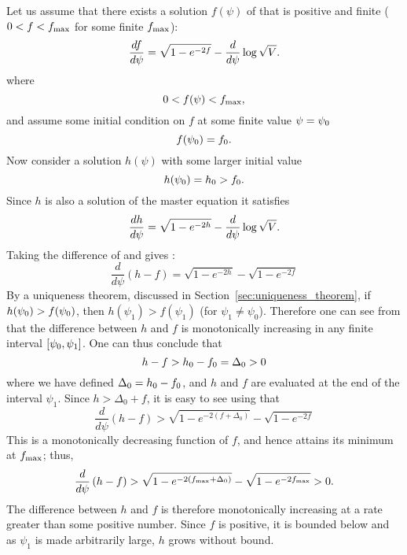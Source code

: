 Let us assume that there exists a solution $f(\psi)$ of
 that is positive and finite ($0<f<f_\mathrm{max}$ for some
finite $f_\mathrm{max}$):
%
\begin{equation}
  \frac{d f}{d \psi} = \sqrt{1-e^{-2f}} -\frac{d}{d\psi}\log \sqrt V.
  \label{eqn:master_eq_f}
\end{equation}
%
where
%
\begin{equation}
  0<f(\psi)<f_\mathrm{max},
\end{equation}
%
and assume some initial condition on $f$ at some finite value
$\psi=\psi_0$
%
\begin{equation}
  f(\psi_0)=f_0.
\end{equation}
%
Now consider a solution $h(\psi)$ with some larger initial value
%
\begin{equation}
  h(\psi_0)=h_0>f_0.
\end{equation}
%
Since $h$ is also a solution of the master equation
 it satisfies
%
\begin{equation}
  \frac{d h}{d \psi} = \sqrt{1-e^{-2h}} -\frac{d}{d\psi}\log \sqrt V.
  \label{eqn:master_eq_h}
\end{equation}
%
Taking the difference of  and
 gives :
%
\begin{equation}
  \frac{d}{d\psi}\left(h-f\right)
  = 
  \sqrt{1-e^{-2h}}-\sqrt{1-e^{-2f}}
  \label{eqn:master_eq_diff}
\end{equation}
%
By a uniqueness theorem, discussed in
Section~\ref{sec:uniqueness_theorem}, if $h(\psi_0)>f(\psi_0)$, then
$h(\psi_1)>f(\psi_1)$ (for $\psi_1\ne\psi_0$). Therefore one can see
from  that the difference between $h$ and $f$
is monotonically increasing in any finite interval $[\psi_0,\psi_1]$.
One can thus conclude that
%
\begin{equation}
  h-f>h_0-f_0=\Delta_0>0
  \label{eqn:cosh_rel}
\end{equation}
%
where we have defined $\Delta_0 = h_0-f_0$, and $h$ and $f$ are
evaluated at the end of the interval $\psi_1$. Since $h>\Delta_0+f$,
it is easy to see using  that
%
\begin{equation}
  \frac{d}{d\psi}\left(h-f\right)
  > 
  \sqrt{1-e^{-2(f+\Delta_0)}}-\sqrt{1-e^{-2f}}
\end{equation}
%
This is a monotonically decreasing function of $f$, and hence attains
its minimum at $f_\mathrm{max}$; thus,
%
\begin{equation}
  \frac{d}{d\psi}\left(h-f\right)
  > 
  \sqrt{1-e^{-2(f_\mathrm{max}+\Delta_0)}}-\sqrt{1-e^{-2f_\mathrm{max}}} 
  >
  0.
\end{equation}
%
The difference between $h$ and $f$ is therefore monotonically
increasing at a rate greater than some positive number. Since $f$ is
positive, it is bounded below and as $\psi_1$ is made arbitrarily
large, $h$ grows without bound.

